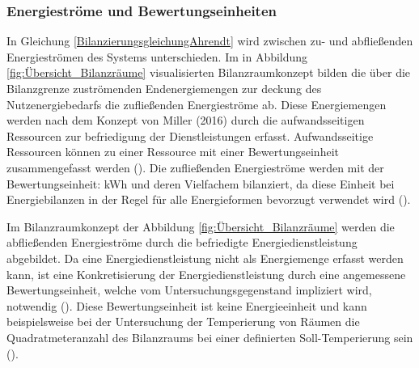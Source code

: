 
\subsubsection{Energieströme und Bewertungseinheiten}

In Gleichung \eqref{BilanzierungsgleichungAhrendt} wird zwischen zu- und abfließenden Energieströmen des Systems unterschieden.
Im in Abbildung \eqref{fig:Übersicht_Bilanzräume} visualisierten Bilanzraumkonzept bilden die über die Bilanzgrenze zuströmenden Endenergiemengen 
zur deckung des Nutzenergiebedarfs die zufließenden Energieströme ab. 
Diese Energiemengen werden nach dem Konzept von Miller (2016) durch die aufwandsseitigen Ressourcen zur befriedigung der Dienstleistungen erfasst.
Aufwandsseitige Ressourcen können zu einer Ressource mit einer Bewertungseinheit zusammengefasst werden (\cite[S. 112]{Miller.2016}).  
Die zufließenden Energieströme werden mit der Bewertungseinheit: kWh und deren Vielfachem bilanziert, da diese Einheit bei Energiebilanzen in der Regel 
für alle Energieformen bevorzugt verwendet wird (\cite[S. 65]{Konstantin.2023}).

Im Bilanzraumkonzept der Abbildung \eqref{fig:Übersicht_Bilanzräume} werden die abfließenden Energieströme durch die befriedigte Energiedienstleistung abgebildet.
Da eine Energiedienstleistung nicht als Energiemenge erfasst werden kann, ist eine Konkretisierung der Energiedienstleistung durch eine angemessene Bewertungseinheit, 
welche vom Untersuchungsgegenstand impliziert wird, notwendig (\cite{Miller.2016}). 
Diese Bewertungseinheit ist keine Energieeinheit und kann beispielsweise bei der Untersuchung der Temperierung 
von Räumen die Quadratmeteranzahl des Bilanzraums bei einer definierten Soll-Temperierung sein (\cite{Miller.2016}). 


